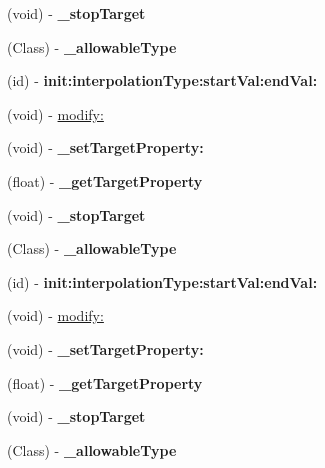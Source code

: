 \begin{DoxyCompactItemize}
\mbox{\label{interfaceCDPropertyModifier_ad4db2857a169bb8abf15b1596a5407de}} 
(void) -\/ {\bfseries \+\_\+stop\+Target}
\item 
\mbox{\label{interfaceCDPropertyModifier_a8f4ee3a547824a5d2045bfbd7ed5474e}} 
(Class) -\/ {\bfseries \+\_\+allowable\+Type}
\item 
\mbox{\label{interfaceCDPropertyModifier_a9abcff3fa09244e63f37da6294127605}} 
(id) -\/ {\bfseries init\+:interpolation\+Type\+:start\+Val\+:end\+Val\+:}
\item 
(void) -\/ \hyperlink{interfaceCDPropertyModifier_a8c2d8d098bc743ad13d80271a03f15d6}{modify\+:}
\item 
\mbox{\label{interfaceCDPropertyModifier_ab5661c86cd671b7393e7012d0e08a355}} 
(void) -\/ {\bfseries \+\_\+set\+Target\+Property\+:}
\item 
\mbox{\label{interfaceCDPropertyModifier_a9aab6ce1e0e21603340230375fb8133e}} 
(float) -\/ {\bfseries \+\_\+get\+Target\+Property}
\item 
\mbox{\label{interfaceCDPropertyModifier_ad4db2857a169bb8abf15b1596a5407de}} 
(void) -\/ {\bfseries \+\_\+stop\+Target}
\item 
\mbox{\label{interfaceCDPropertyModifier_a8f4ee3a547824a5d2045bfbd7ed5474e}} 
(Class) -\/ {\bfseries \+\_\+allowable\+Type}
\item 
\mbox{\label{interfaceCDPropertyModifier_a9abcff3fa09244e63f37da6294127605}} 
(id) -\/ {\bfseries init\+:interpolation\+Type\+:start\+Val\+:end\+Val\+:}
\item 
(void) -\/ \hyperlink{interfaceCDPropertyModifier_a8c2d8d098bc743ad13d80271a03f15d6}{modify\+:}
\item 
\mbox{\label{interfaceCDPropertyModifier_ab5661c86cd671b7393e7012d0e08a355}} 
(void) -\/ {\bfseries \+\_\+set\+Target\+Property\+:}
\item 
\mbox{\label{interfaceCDPropertyModifier_a9aab6ce1e0e21603340230375fb8133e}} 
(float) -\/ {\bfseries \+\_\+get\+Target\+Property}
\item 
\mbox{\label{interfaceCDPropertyModifier_ad4db2857a169bb8abf15b1596a5407de}} 
(void) -\/ {\bfseries \+\_\+stop\+Target}
\item 
\mbox{\label{interfaceCDPropertyModifier_a8f4ee3a547824a5d2045bfbd7ed5474e}} 
(Class) -\/ {\bfseries \+\_\+allowable\+Type}
\end{DoxyCompactItemize}

